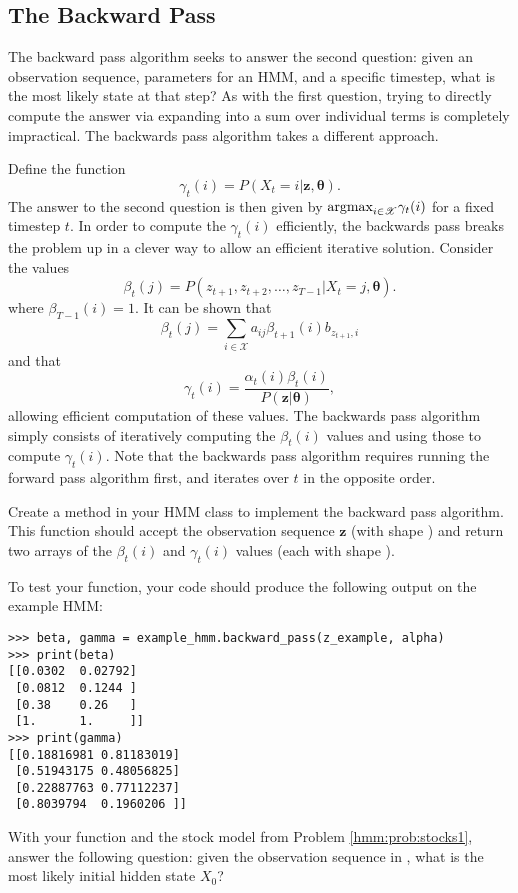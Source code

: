 \subsection*{The Backward Pass}
The backward pass algorithm seeks to answer the second question: given an observation sequence, parameters for an HMM, and a specific timestep, what is the most likely state at that step?
As with the first question, trying to directly compute the answer via expanding into a sum over individual terms is completely impractical.
The backwards pass algorithm takes a different approach.

Define the function
\[
\gamma_t(i)=P(X_t=i|\mathbf{z},\boldsymbol\theta).
\]
The answer to the second question is then given by $\mbox{argmax}_{i\in\mathscr{X}}\gamma_t(i)$ for a fixed timestep $t$.
In order to compute the $\gamma_t(i)$ efficiently, the backwards pass breaks the problem up in a clever way to allow an efficient iterative solution.
Consider the values
\[
\beta_t(j)=P(z_{t+1},z_{t+2},\ldots,z_{T-1}|X_t=j,\boldsymbol\theta).
\]
where $\beta_{T-1}(i)=1$.
It can be shown that
\[
\beta_t(j)
=\sum_{i\in\mathscr{X}} a_{ij}\beta_{t+1}(i)b_{z_{t+1},i}
\]
and that
\[
\gamma_t(i)=\frac{\alpha_t(i)\beta_t(i)}{P(\mathbf{z}|\boldsymbol\theta)},
\]
allowing efficient computation of these values.
The backwards pass algorithm simply consists of iteratively computing the $\beta_t(i)$ values and using those to compute $\gamma_t(i)$.
Note that the backwards pass algorithm requires running the forward pass algorithm first, and iterates over $t$ in the opposite order.

\begin{problem}\label{hmm:prob:backwards}
Create a method  in your HMM class to implement the backward pass algorithm.
This function should accept the observation sequence $\mathbf{z}$ (with shape ) and return two arrays of the $\beta_t(i)$ and $\gamma_t(i)$ values (each with shape ).

To test your function, your code should produce the following output on the example HMM:
\begin{lstlisting}
>>> beta, gamma = example_hmm.backward_pass(z_example, alpha)
>>> print(beta)
[[0.0302  0.02792]
 [0.0812  0.1244 ]
 [0.38    0.26   ]
 [1.      1.     ]]
>>> print(gamma)
[[0.18816981 0.81183019]
 [0.51943175 0.48056825]
 [0.22887763 0.77112237]
 [0.8039794  0.1960206 ]]
\end{lstlisting}

With your function and the stock model from Problem \ref{hmm:prob:stocks1}, answer the following question: given the observation sequence in , what is the most likely initial hidden state $X_0$?
\end{problem}

